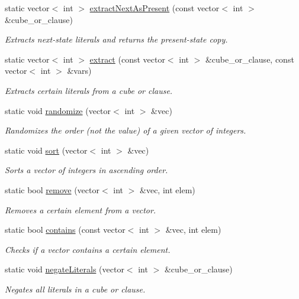 \begin{DoxyCompactItemize}
static vector$<$ int $>$ \hyperlink{classUtils_a9251f04947864aaaac7e459987913429}{extract\-Next\-As\-Present} (const vector$<$ int $>$ \&cube\-\_\-or\-\_\-clause)
\begin{DoxyCompactList}\small\item\em Extracts next-\/state literals and returns the present-\/state copy. \end{DoxyCompactList}\item 
static vector$<$ int $>$ \hyperlink{classUtils_a21f2b014ac53ca027864c57e24a60195}{extract} (const vector$<$ int $>$ \&cube\-\_\-or\-\_\-clause, const vector$<$ int $>$ \&vars)
\begin{DoxyCompactList}\small\item\em Extracts certain literals from a cube or clause. \end{DoxyCompactList}\item 
static void \hyperlink{classUtils_a71efa1aa570b356a328e95008fb65ad8}{randomize} (vector$<$ int $>$ \&vec)
\begin{DoxyCompactList}\small\item\em Randomizes the order (not the value) of a given vector of integers. \end{DoxyCompactList}\item 
static void \hyperlink{classUtils_a2843ae3d849c66ebd72baea26fbd7580}{sort} (vector$<$ int $>$ \&vec)
\begin{DoxyCompactList}\small\item\em Sorts a vector of integers in ascending order. \end{DoxyCompactList}\item 
static bool \hyperlink{classUtils_a15b142132eb40445f51b1f1bb89b85f3}{remove} (vector$<$ int $>$ \&vec, int elem)
\begin{DoxyCompactList}\small\item\em Removes a certain element from a vector. \end{DoxyCompactList}\item 
static bool \hyperlink{classUtils_a84611c8a027ac12426219cb4d59765aa}{contains} (const vector$<$ int $>$ \&vec, int elem)
\begin{DoxyCompactList}\small\item\em Checks if a vector contains a certain element. \end{DoxyCompactList}\item 
static void \hyperlink{classUtils_ae7584589e0d06005fe893fdb9244483a}{negate\-Literals} (vector$<$ int $>$ \&cube\-\_\-or\-\_\-clause)
\begin{DoxyCompactList}\small\item\em Negates all literals in a cube or clause. \end{DoxyCompactList}\item 

\end{DoxyCompactItemize}
